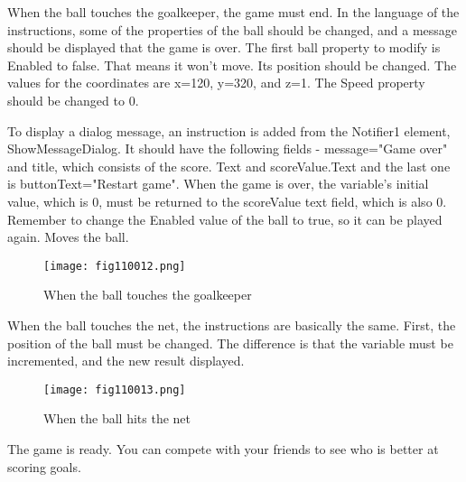 When the ball touches the goalkeeper, the game must end. In the language of the instructions, some of the properties of the ball should be changed, and a message should be displayed that the game is over. The first ball property to modify is Enabled to false. That means it won't move. Its position should be changed. The values for the coordinates are x=120, y=320, and z=1. The Speed property should be changed to 0.

To display a dialog message, an instruction is added from the Notifier1 element, ShowMessageDialog. It should have the following fields - message="Game over" and title, which consists of the score. Text and scoreValue.Text and the last one is buttonText="Restart game". When the game is over, the variable's initial value, which is 0, must be returned to the scoreValue text field, which is also 0. Remember to change the Enabled value of the ball to true, so it can be played again. Moves the ball.

\begin{figure}[H]
   \centering
   \texttt{[image: fig110012.png]}
   \caption{When the ball touches the goalkeeper}
\label{fig110012}
\end{figure}

When the ball touches the net, the instructions are basically the same. First, the position of the ball must be changed. The difference is that the variable must be incremented, and the new result displayed.

\begin{figure}[H]
   \centering
   \texttt{[image: fig110013.png]}
   \caption{When the ball hits the net}
\label{fig110013}
\end{figure}

The game is ready. You can compete with your friends to see who is better at scoring goals.
